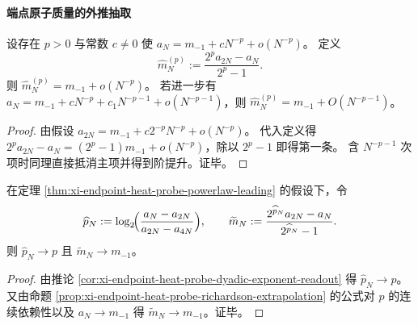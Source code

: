 \paragraph{端点原子质量的外推抽取}
\begin{proposition}\label{prop:xi-endpoint-heat-probe-richardson-extrapolation}
设存在 \(p>0\) 与常数 \(c\neq 0\) 使
\(
a_N=m_{-1}+cN^{-p}+o(N^{-p})
\)。
定义
\[
\widehat m_N^{(p)}:=\frac{2^{p}a_{2N}-a_N}{2^{p}-1}.
\]
则 \(\widehat m_N^{(p)}=m_{-1}+o(N^{-p})\)。
若进一步有
\(
a_N=m_{-1}+cN^{-p}+c_1N^{-p-1}+o(N^{-p-1})
\)，则 \(\widehat m_N^{(p)}=m_{-1}+O(N^{-p-1})\)。
\end{proposition}
\begin{proof}
由假设
\(
a_{2N}=m_{-1}+c2^{-p}N^{-p}+o(N^{-p})
\)。
代入定义得
\(
2^pa_{2N}-a_N=(2^p-1)m_{-1}+o(N^{-p})
\)，除以 \(2^p-1\) 即得第一条。
含 \(N^{-p-1}\) 次项时同理直接抵消主项并得到阶提升。证毕。
\end{proof}

\begin{corollary}\label{cor:xi-endpoint-heat-probe-adaptive-extrapolation}
在定理 \ref{thm:xi-endpoint-heat-probe-powerlaw-leading} 的假设下，令
\[
\widehat p_N:=\log_2\!\Bigl(\frac{a_N-a_{2N}}{a_{2N}-a_{4N}}\Bigr),
\qquad
\widetilde m_N:=\frac{2^{\widehat p_N}a_{2N}-a_N}{2^{\widehat p_N}-1}.
\]
则 \(\widehat p_N\to p\) 且 \(\widetilde m_N\to m_{-1}\)。
\end{corollary}
\begin{proof}
由推论 \ref{cor:xi-endpoint-heat-probe-dyadic-exponent-readout} 得 \(\widehat p_N\to p\)。
又由命题 \ref{prop:xi-endpoint-heat-probe-richardson-extrapolation} 的公式对 \(p\) 的连续依赖性以及 \(a_N\to m_{-1}\) 得 \(\widetilde m_N\to m_{-1}\)。证毕。
\end{proof}


